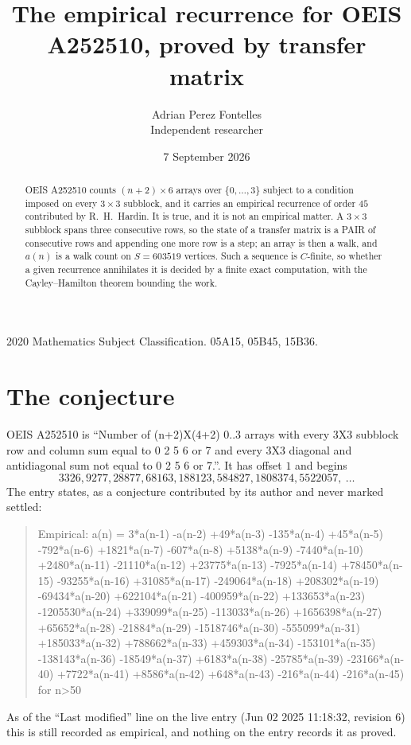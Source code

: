 \documentclass[11pt,a4paper]{article}
\title{The empirical recurrence for OEIS A252510, proved by transfer matrix}
\author{Adrian Perez Fontelles\\ \small Independent researcher}
\date{7 September 2026}
\theoremstyle{plain}
\theoremstyle{definition}
\begin{document}
\maketitle

\begin{abstract}
OEIS A252510 counts $(n+2)\times6$ arrays over $\{0,\dots,3\}$ subject to a condition imposed on
every $3\times3$ subblock, and it carries an empirical recurrence of order $45$
contributed by R.~H.~Hardin. It is true, and it is not an empirical matter. A $3\times3$
subblock spans three consecutive rows, so the state of a transfer matrix is a PAIR of
consecutive rows and appending one more row is a step; an array is then a walk, and
$a(n)$ is a walk count on $S=603519$ vertices. Such a sequence is $C$-finite, so whether a given
recurrence annihilates it is decided by a finite exact computation, with the Cayley--Hamilton
theorem bounding the work.
\end{abstract}

\noindent\small 2020 Mathematics Subject Classification. 05A15, 05B45, 15B36.\normalsize

\section{The conjecture}

OEIS A252510 is ``Number of (n+2)X(4+2) 0..3 arrays with every 3X3 subblock row and column sum equal to 0 2 5 6 or 7 and every 3X3 diagonal and antidiagonal sum not equal to 0 2 5 6 or 7.''. It has offset $1$ and begins
\[
3326, 9277, 28877, 68163, 188123, 584827, 1808374, 5522057,\ \dots
\]
The entry states, as a conjecture contributed by its author and never marked settled:
\begin{quote}
Empirical: a(n) = 3*a(n-1) -a(n-2) +49*a(n-3) -135*a(n-4) +45*a(n-5) -792*a(n-6) +1821*a(n-7) -607*a(n-8) +5138*a(n-9) -7440*a(n-10) +2480*a(n-11) -21110*a(n-12) +23775*a(n-13) -7925*a(n-14) +78450*a(n-15) -93255*a(n-16) +31085*a(n-17) -249064*a(n-18) +208302*a(n-19) -69434*a(n-20) +622104*a(n-21) -400959*a(n-22) +133653*a(n-23) -1205530*a(n-24) +339099*a(n-25) -113033*a(n-26) +1656398*a(n-27) +65652*a(n-28) -21884*a(n-29) -1518746*a(n-30) -555099*a(n-31) +185033*a(n-32) +788662*a(n-33) +459303*a(n-34) -153101*a(n-35) -138143*a(n-36) -18549*a(n-37) +6183*a(n-38) -25785*a(n-39) -23166*a(n-40) +7722*a(n-41) +8586*a(n-42) +648*a(n-43) -216*a(n-44) -216*a(n-45) for n>50
\end{quote}
As of the ``Last modified'' line on the live entry (Jun 02 2025 11:18:32, revision 6) this is still
recorded as empirical, and nothing on the entry records it as proved.
\end{document}
